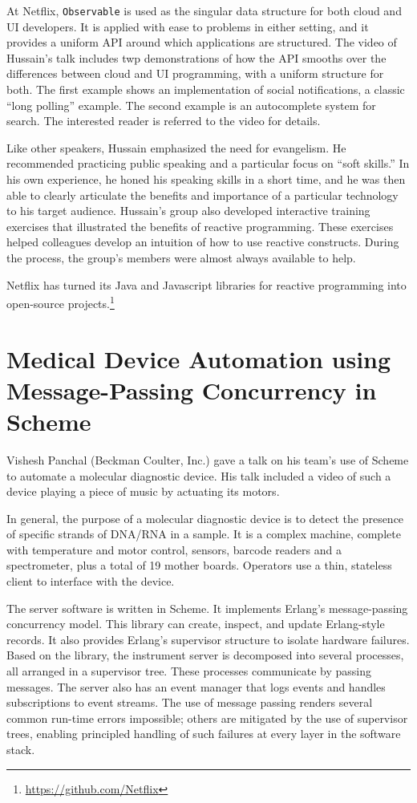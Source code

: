 \documentclass{jfp1}
\begin{document}
At Netflix, \texttt{Observable} is used as the singular data structure for
both cloud and UI developers. It is applied with ease to problems in
either setting, and it provides a uniform API around which applications
are structured. The video of Hussain's talk includes twp demonstrations of
how the API smooths over the differences between cloud and UI programming,
with a uniform structure for both. The first example shows an
implementation of social notifications, a classic ``long polling''
example. The second example is an autocomplete system for search. The
interested reader is referred to the video for details. 

Like other speakers, Hussain emphasized the need for evangelism.  He
recommended practicing public speaking and a particular focus on ``soft
skills.'' In his own experience, he honed his speaking skills in a short
time, and he was then able to clearly articulate the benefits and
importance of a particular technology to his target audience.  Hussain's
group also developed interactive training exercises that illustrated the
benefits of reactive programming. These exercises helped colleagues
develop an intuition of how to use reactive constructs. During the
process, the group's members were almost always available to help.

Netflix has turned its Java and Javascript libraries for reactive
programming into open-source
projects.\footnote{\url{https://github.com/Netflix}}

\section{Medical Device Automation using Message-Passing Concurrency in Scheme}


Vishesh Panchal (Beckman Coulter, Inc.) gave a talk on his team's use of
Scheme to automate a molecular diagnostic device. His talk included a
video of such a device playing a piece of music by actuating its motors.

In general, the purpose of a molecular diagnostic device is to detect the
presence of specific strands of DNA/RNA in a sample. It is a complex
machine, complete with temperature and motor control, sensors, barcode
readers and a spectrometer, plus a total of 19 mother boards. Operators
use a thin, stateless client to interface with the device.  

The server software is written in Scheme. It implements Erlang's
message-passing concurrency model. This library can create, inspect, and
update Erlang-style records. It also provides Erlang's supervisor
structure to isolate hardware failures. Based on the library, the
instrument server is decomposed into several processes, all arranged in a
supervisor tree. These processes communicate by passing messages. The
server also has an event manager that logs events and handles
subscriptions to event streams. The use of message passing renders several
common run-time errors impossible; others are mitigated by the use of
supervisor trees, enabling principled handling of such failures at every
layer in the software stack.
\end{document}
